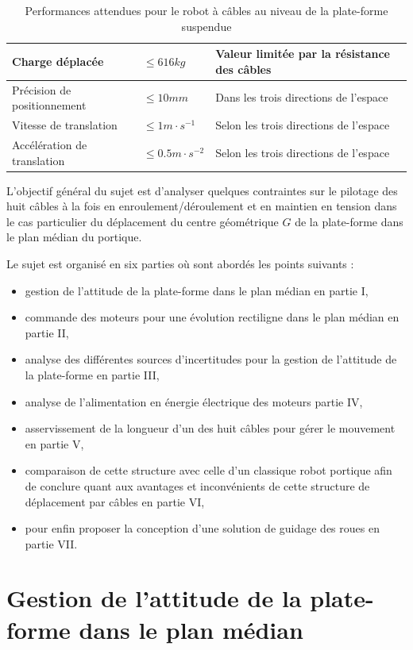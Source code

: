 \begin{table}[ht!]
\begin{tabular}{|l|l|l|}
\hline
Charge déplacée & $\leq 616 kg$ & Valeur limitée par la résistance des câbles \\
\hline
Précision de positionnement & $\leq 10 mm$ & Dans les trois directions de l’espace \\
\hline
Vitesse de translation & $\leq 1m\cdot s^{-1}$ & Selon les trois directions de l’espace \\
\hline
Accélération de translation & $\leq 0.5m\cdot s^{-2}$ & Selon les trois directions de l’espace\\
\hline
\end{tabular}
\caption{\label{tab1} Performances attendues pour le robot à câbles au niveau de la plate-forme suspendue}
\end{table}

L’objectif général du sujet est d’analyser quelques contraintes sur le pilotage des huit câbles à la fois en enroulement/déroulement et en maintien en tension dans le cas particulier du déplacement du centre géométrique $G$ de la plate-forme dans le plan médian du portique.

Le sujet est organisé en six parties où sont abordés les points suivants :
\begin{itemize}
 \item gestion de l’attitude de la plate-forme dans le plan médian en partie I,
 \item commande des moteurs pour une évolution rectiligne dans le plan médian en partie II,
 \item analyse des différentes sources d’incertitudes pour la gestion de l’attitude de la plate-forme en partie III,
 \item analyse de l’alimentation en énergie électrique des moteurs partie IV,
 \item asservissement de la longueur d’un des huit câbles pour gérer le mouvement en partie V,
 \item comparaison de cette structure avec celle d’un classique robot portique afin de conclure quant aux avantages et inconvénients de cette structure de déplacement par câbles en partie VI,
 \item pour enfin proposer la conception d'une solution de guidage des roues en partie VII.
\end{itemize}

\newpage

\section{Gestion de l’attitude de la plate-forme dans le plan médian}

